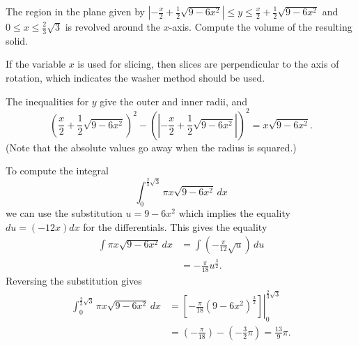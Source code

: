 \documentclass{ximera}
\begin{document}
\begin{question}%

The region in the plane given by \(\left|{- \frac{x}{2} + \frac{1}{2} \sqrt{9 - 6 x^{2}}}\right| \leq y \leq \frac{x}{2} + \frac{1}{2} \sqrt{9 - 6 x^{2}}\) and \(0 \leq x \leq \frac{2}{3} \sqrt{3}\) is revolved around the \(x\)-axis. Compute the volume of the resulting solid.
\begin{multiplechoice}
\end{multiplechoice}
\begin{feedback}
If the variable \(x\) is used for slicing, then slices are perpendicular to the axis of rotation, which indicates the washer method should be used.
\begin{hint}
The inequalities for \(y\) give the outer and inner radii, and \[ \left(\frac{x}{2} + \frac{1}{2} \sqrt{9 - 6 x^{2}}\right)^2 - \left( \left|{- \frac{x}{2} + \frac{1}{2} \sqrt{9 - 6 x^{2}}}\right|\right)^2 = x \sqrt{9 - 6 x^{2}}. \](Note that the absolute values go away when the radius is squared.)
\begin{hint}
To compute the integral 
\[ \int_{0}^{\frac{2}{3} \sqrt{3}} \pi x \sqrt{9 - 6 x^{2}}\, dx \]
 we can use the substitution \(u = 9 - 6 x^{2}\) which implies the equality \(du = \left(- 12 x\right)dx\) for the differentials. This gives the equality
\[ \begin{aligned} \int \pi x \sqrt{9 - 6 x^{2}}\, dx & = \int \left(- \frac{\pi}{12} \sqrt{u}\right)\, du \\
 & = - \frac{\pi}{18} u^{\frac{3}{2}}. \end{aligned} \]
Reversing the substitution gives
\[ \begin{aligned} \int_{0}^{\frac{2}{3} \sqrt{3}} \pi x \sqrt{9 - 6 x^{2}}\, dx & = \left. \left[- \frac{\pi}{18} \left(9 - 6 x^{2}\right)^{\frac{3}{2}} \right] \right|_{0}^{\frac{2}{3} \sqrt{3}}\\ & = \left(- \frac{\pi}{18} \right) - \left(- \frac{3}{2} \pi \right) = \frac{13}{9} \pi. \end{aligned} \]
\end{hint}
\end{hint}
\end{feedback}

\end{question}
\end{document}
